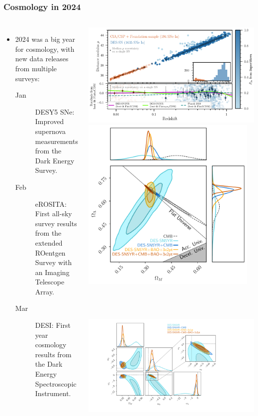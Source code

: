 \documentclass[aspectratio=169]{beamer}
\begin{document}
\begin{frame}
    \frametitle{Cosmology in 2024}
    \begin{columns}
        \begin{itemize}
            \item 2024 was a big year for cosmology, with new data releases from multiple surveys:
                \begin{description}
                    \item[Jan] DESY5 SNe:  Improved supernova measurements from the Dark Energy Survey. \hfill {}
                    \item[Feb] eROSITA: First all-sky survey results from the extended ROentgen Survey with an Imaging Telescope Array. \hfill {}
                    \item[Mar] DESI:  First year cosmology results from the Dark Energy Spectroscopic Instrument. \hfill {}
                \end{description}
        \end{itemize}
        \includegraphics[width=\textwidth]{figures/HD_5yr_KeyPaper.pdf}
        \includegraphics[height=0.42\textwidth]{figures/LCDM_paper.pdf}%
        \includegraphics[height=0.42\textwidth]{figures/w0wa_paper_wZoom.pdf}
    \end{columns}
\end{frame}
\end{document}
